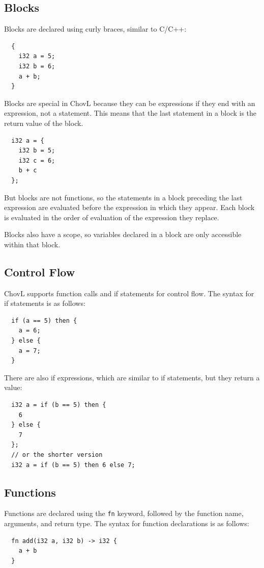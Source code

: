 \subsection{Blocks}
Blocks are declared using curly braces, similar to C/C++:
\begin{verbatim}
  {
    i32 a = 5;
    i32 b = 6;
    a + b;
  }
\end{verbatim}

Blocks are special in ChovL because they can be expressions if they end with an expression, not a statement. This means that the last statement in a block is the return value of the block.
\begin{verbatim}
  i32 a = {
    i32 b = 5;
    i32 c = 6;
    b + c
  };
\end{verbatim}

But blocks are not functions, so the statements in a block preceding the last expression are evaluated before the expression in which they appear. Each block is evaluated in the order of evaluation of the expression they replace.

Blocks also have a scope, so variables declared in a block are only accessible within that block.

\subsection{Control Flow}
ChovL supports function calls and if statements for control flow. The syntax for if statements is as follows:
\begin{verbatim}
  if (a == 5) then {
    a = 6;
  } else {
    a = 7;
  }
\end{verbatim}

There are also if expressions, which are similar to if statements, but they return a value:
\begin{verbatim}
  i32 a = if (b == 5) then {
    6
  } else {
    7
  };
  // or the shorter version
  i32 a = if (b == 5) then 6 else 7;
\end{verbatim}

\subsection{Functions}
Functions are declared using the \texttt{fn} keyword, followed by the function name, arguments, and return type. The syntax for function declarations is as follows:
\begin{verbatim}
  fn add(i32 a, i32 b) -> i32 {
    a + b
  }
\end{verbatim}

